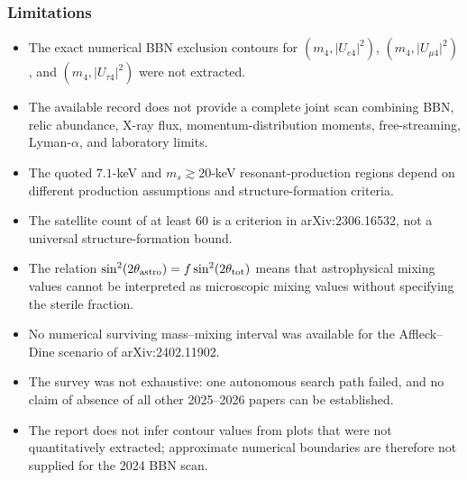 \documentclass[11pt,a4paper]{article}
\begin{document}
\subsubsection*{Limitations}
\begin{itemize}
  \item The exact numerical BBN exclusion contours for \((m_4,\lvert U_{e4}\rvert^2)\), \((m_4,\lvert U_{\mu4}\rvert^2)\), and \((m_4,\lvert U_{\tau4}\rvert^2)\) were not extracted.
  \item The available record does not provide a complete joint scan combining BBN, relic abundance, X-ray flux, momentum-distribution moments, free-streaming, Lyman-\(\alpha\), and laboratory limits.
  \item The quoted \(7.1\)-keV and \(m_s\gtrsim20\)-keV resonant-production regions depend on different production assumptions and structure-formation criteria.
  \item The satellite count of at least 60 is a criterion in arXiv:2306.16532, not a universal structure-formation bound.
  \item The relation \(\sin^2(2\theta_{\rm astro})=f\sin^2(2\theta_{\rm tot})\) means that astrophysical mixing values cannot be interpreted as microscopic mixing values without specifying the sterile fraction.
  \item No numerical surviving mass--mixing interval was available for the Affleck--Dine scenario of arXiv:2402.11902.
  \item The survey was not exhaustive: one autonomous search path failed, and no claim of absence of all other 2025--2026 papers can be established.
  \item The report does not infer contour values from plots that were not quantitatively extracted; approximate numerical boundaries are therefore not supplied for the 2024 BBN scan.
\end{itemize}
\end{document}
